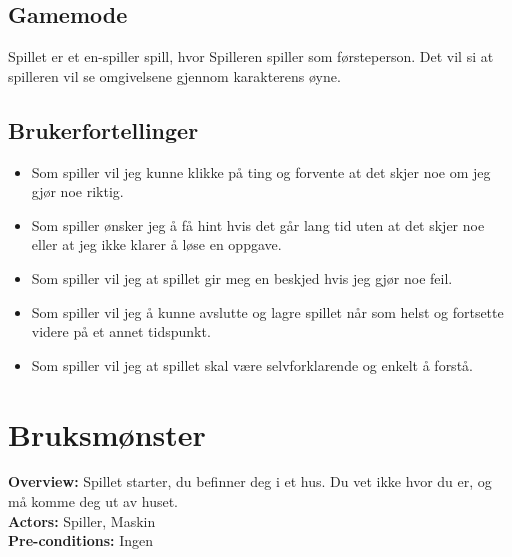 \documentclass[a4paper]{article}
\begin{document}
\subsection{Gamemode}
Spillet er et en-spiller spill, hvor Spilleren spiller som førsteperson. Det vil si at spilleren vil se omgivelsene gjennom karakterens øyne.

\subsection{Brukerfortellinger}
\begin{itemize}
\item Som spiller vil jeg kunne klikke på ting og forvente at det skjer noe om jeg gjør noe riktig.
\item Som spiller ønsker jeg å få hint hvis det går lang tid uten at det skjer noe eller at jeg ikke klarer å løse en oppgave.
\item Som spiller vil jeg at spillet gir meg en beskjed hvis jeg gjør noe feil.
\item Som spiller vil jeg å kunne avslutte og lagre spillet når som helst og fortsette videre på et annet tidspunkt.
\item Som spiller vil jeg at spillet skal være selvforklarende og enkelt å forstå.
\end{itemize}

\section{Bruksmønster}

\begin{raggedright}
{\bf Overview:} Spillet starter, du befinner deg i et hus. Du vet ikke hvor du er, og må komme deg ut av huset.\\
{\bf Actors:} Spiller, Maskin\\
{\bf Pre-conditions:} Ingen\\
\end{raggedright}
\end{document}
